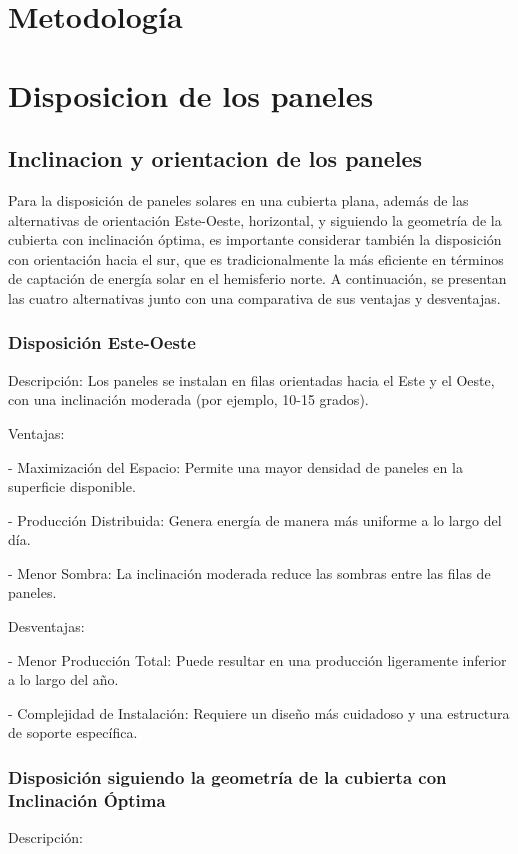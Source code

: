 \documentclass[a4paper,12pt]{article}
\begin{document}
\begin{Form}
\section{Metodología}
\section{Disposicion de los paneles}


\subsection*{ Inclinacion  y orientacion de los paneles}


Para la disposición de paneles solares en una cubierta plana, además de las alternativas de orientación Este-Oeste, horizontal, y siguiendo la geometría de la cubierta con inclinación óptima, es importante considerar también la disposición con orientación hacia el sur, que es tradicionalmente la más eficiente en términos de captación de energía solar en el hemisferio norte. A continuación, se presentan las cuatro alternativas junto con una comparativa de sus ventajas y desventajas.

\subsubsection*{Disposición Este-Oeste}
Descripción:
Los paneles se instalan en filas orientadas hacia el Este y el Oeste, con una inclinación moderada (por ejemplo, 10-15 grados).

Ventajas:

    - Maximización del Espacio: Permite una mayor densidad de paneles en la superficie disponible.

    - Producción Distribuida: Genera energía de manera más uniforme a lo largo del día.

    - Menor Sombra: La inclinación moderada reduce las sombras entre las filas de paneles.

Desventajas:

    - Menor Producción Total: Puede resultar en una producción ligeramente inferior a lo largo del año.

    - Complejidad de Instalación: Requiere un diseño más cuidadoso y una estructura de soporte específica.


\subsubsection*{Disposición siguiendo la geometría de la cubierta con Inclinación Óptima}
Descripción:


\end{Form}
\end{document}

